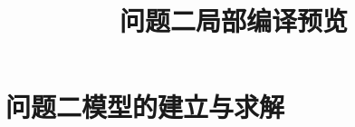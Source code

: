 \documentclass[withoutpreface]{../../../paper/cumcmthesis}
\title{问题二局部编译预览}
\begin{document}
\maketitle
\section{问题二模型的建立与求解}

\end{document}
